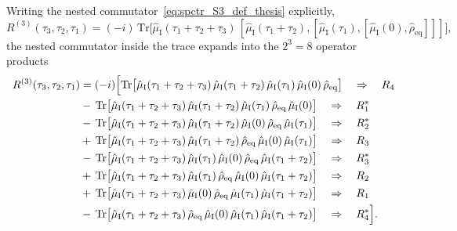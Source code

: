 Writing the nested commutator~\autoref{eq:spctr_S3_def_thesis} explicitly,
\begin{equation*}
	R^{(3)}(\tau_3,\tau_2,\tau_1)
	=(-i)\,
	\mathrm{Tr}\Big[\hat{\mu}_{\mathrm{I}}(\tau_{1}+\tau_{2}+\tau_{3})\,[\hat{\mu}_{\mathrm{I}}(\tau_{1}+\tau_{2}),[\hat{\mu}_{\mathrm{I}}(\tau_1),[\hat{\mu}_{\mathrm{I}}(0),\hat{\rho}_{\mathrm{eq}}]]]\Big],
\end{equation*}
the nested commutator inside the trace expands into the $2^3=8$ operator products
\begin{align}
	\label{eq:spctr_R3_commutator_expansion_R1R4_S4}
	R^{(3)}(\tau_3,\tau_2,\tau_1) & = (-i)\Big[\mathrm{Tr}\big[\hat{\mu}_{\mathrm{I}}(\tau_{1}+\tau_{2}+\tau_{3})\,\hat{\mu}_{\mathrm{I}}(\tau_{1}+\tau_{2})\,\hat{\mu}_{\mathrm{I}}(\tau_1)\,\hat{\mu}_{\mathrm{I}}(0)\,\hat{\rho}_{\mathrm{eq}}\big]
	\quad\Rightarrow\quad R_4
	\\
	                              & -\,\mathrm{Tr}\big[\hat{\mu}_{\mathrm{I}}(\tau_{1}+\tau_{2}+\tau_{3})\,\hat{\mu}_{\mathrm{I}}(\tau_{1}+\tau_{2})\,\hat{\mu}_{\mathrm{I}}(\tau_1)\,\hat{\rho}_{\mathrm{eq}}\,\hat{\mu}_{\mathrm{I}}(0)\big]
	\quad\Rightarrow\quad R_1^{*}
	\notag\\
	                              & -\,\mathrm{Tr}\big[\hat{\mu}_{\mathrm{I}}(\tau_{1}+\tau_{2}+\tau_{3})\,\hat{\mu}_{\mathrm{I}}(\tau_{1}+\tau_{2})\,\hat{\mu}_{\mathrm{I}}(0)\,\hat{\rho}_{\mathrm{eq}}\,\hat{\mu}_{\mathrm{I}}(\tau_1)\big]
	\quad\Rightarrow\quad R_2^{*}
	\notag\\
	                              & +\,\mathrm{Tr}\big[\hat{\mu}_{\mathrm{I}}(\tau_{1}+\tau_{2}+\tau_{3})\,\hat{\mu}_{\mathrm{I}}(\tau_{1}+\tau_{2})\,\hat{\rho}_{\mathrm{eq}}\,\hat{\mu}_{\mathrm{I}}(0)\,\hat{\mu}_{\mathrm{I}}(\tau_1)\big]
	\quad\Rightarrow\quad R_3
	\notag\\
	                              & -\,\mathrm{Tr}\big[\hat{\mu}_{\mathrm{I}}(\tau_{1}+\tau_{2}+\tau_{3})\,\hat{\mu}_{\mathrm{I}}(\tau_1)\,\hat{\mu}_{\mathrm{I}}(0)\,\hat{\rho}_{\mathrm{eq}}\,\hat{\mu}_{\mathrm{I}}(\tau_{1}+\tau_{2})\big]
	\quad\Rightarrow\quad R_3^{*}
	\notag\\
	                              & +\,\mathrm{Tr}\big[\hat{\mu}_{\mathrm{I}}(\tau_{1}+\tau_{2}+\tau_{3})\,\hat{\mu}_{\mathrm{I}}(\tau_1)\,\hat{\rho}_{\mathrm{eq}}\,\hat{\mu}_{\mathrm{I}}(0)\,\hat{\mu}_{\mathrm{I}}(\tau_{1}+\tau_{2})\big]
	\quad\Rightarrow\quad R_2
	\notag\\
	                              & +\,\mathrm{Tr}\big[\hat{\mu}_{\mathrm{I}}(\tau_{1}+\tau_{2}+\tau_{3})\,\hat{\mu}_{\mathrm{I}}(0)\,\hat{\rho}_{\mathrm{eq}}\,\hat{\mu}_{\mathrm{I}}(\tau_1)\,\hat{\mu}_{\mathrm{I}}(\tau_{1}+\tau_{2})\big]
	\quad\Rightarrow\quad R_1
	\notag\\
	                              & -\,\mathrm{Tr}\big[\hat{\mu}_{\mathrm{I}}(\tau_{1}+\tau_{2}+\tau_{3})\,\hat{\rho}_{\mathrm{eq}}\,\hat{\mu}_{\mathrm{I}}(0)\,\hat{\mu}_{\mathrm{I}}(\tau_1)\,\hat{\mu}_{\mathrm{I}}(\tau_{1}+\tau_{2})\big]
	\quad\Rightarrow\quad R_4^{*}\Big].
	\label{eq:spctr_R3_commutator_expansion_R1R4_S4star}
\end{align}
